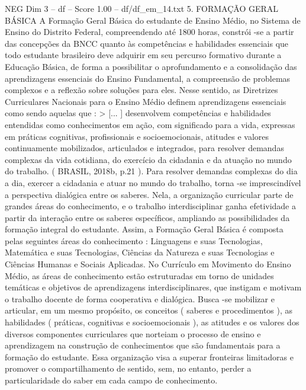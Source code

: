 \begin{textsample}{NEG Dim 3 – df – Score 1.00 – df/df\_em\_14.txt}  \label{ex:f3_neg_164}
5.
FORMAÇÃO GERAL BÁSICA A Formação Geral Básica do estudante de Ensino Médio, no Sistema de Ensino do Distrito Federal, compreendendo até 1800 horas, constrói -se a partir das concepções da BNCC quanto às competências e habilidades essenciais que todo estudante brasileiro deve adquirir em seu percurso formativo durante a Educação Básica, de forma a possibilitar o aprofundamento e a consolidação das aprendizagens essenciais do Ensino Fundamental, a compreensão de problemas complexos e a reflexão sobre soluções para eles.
Nesse sentido, as Diretrizes Curriculares Nacionais para o Ensino Médio definem aprendizagens essenciais como sendo aquelas que : > [... ] desenvolvem competências e habilidades entendidas como conhecimentos em ação, com significado para a vida, expressas em práticas cognitivas, profissionais e socioemocionais, atitudes e valores continuamente mobilizados, articulados e integrados, para resolver demandas complexas da vida cotidiana, do exercício da cidadania e da atuação no mundo do trabalho. ( BRASIL, 2018b, p.21 ).
Para resolver demandas complexas do dia a dia, exercer a cidadania e atuar no mundo do trabalho, torna -se imprescindível a perspectiva dialógica entre os saberes.
Nela, a organização curricular parte de grandes áreas do conhecimento, e o trabalho interdisciplinar ganha efetividade a partir da interação entre os saberes específicos, ampliando as possibilidades da formação integral do estudante.
Assim, a Formação Geral Básica é composta pelas seguintes áreas do conhecimento : Linguagens e suas Tecnologias, Matemática e suas Tecnologias, Ciências da Natureza e suas Tecnologias e Ciências Humanas e Sociais Aplicadas.
No Currículo em Movimento do Ensino Médio, as áreas de conhecimento estão estruturadas em torno de unidades temáticas e objetivos de aprendizagens interdisciplinares, que instigam e motivam o trabalho docente de forma cooperativa e dialógica.
Busca -se mobilizar e articular, em um mesmo propósito, os conceitos ( saberes e procedimentos ), as habilidades ( práticas, cognitivas e socioemocionais ), as atitudes e os valores dos diversos componentes curriculares que norteiam o processo de ensino e aprendizagem na construção de conhecimentos que são fundamentais para a formação do estudante.
Essa organização visa a superar fronteiras limitadoras e promover o compartilhamento de sentido, sem, no entanto, perder a particularidade do saber em cada campo de conhecimento.

\end{textsample}

